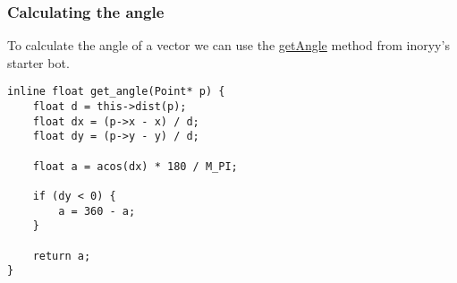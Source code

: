 \documentclass[main.tex]{subfiles}
\begin{document}
\subsubsection{Calculating the angle}

\par
To calculate the angle of a vector we can use the \href{https://github.com/inoryy/csb-ai-starter/blob/master/main.cpp#L325}{getAngle} method from inoryy's starter bot.

\begin{lstlisting}
inline float get_angle(Point* p) {
    float d = this->dist(p);
    float dx = (p->x - x) / d;
    float dy = (p->y - y) / d;

    float a = acos(dx) * 180 / M_PI;

    if (dy < 0) {
        a = 360 - a;
    }

    return a;
}
\end{lstlisting}


\end{document}
